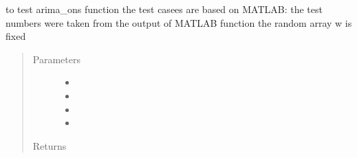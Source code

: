 \documentclass[letterpaper,10pt,english]{sphinxmanual}
\begin{document}
\begin{fulllineitems}
\label{\detokenize{LDS:LDS.OnlineLDS_library.test_arima_ons}}
\sphinxAtStartPar
to test arima\_ons function
the test casees are based on MATLAB:
the test numbers were taken from the output of MATLAB function
the random array w is fixed
\begin{quote}\begin{description}
\item[{Parameters}] \leavevmode\begin{itemize}
\item {} 
\sphinxAtStartPar
{} \textendash{} 

\item {} 
\sphinxAtStartPar
{} \textendash{} 

\item {} 
\sphinxAtStartPar
{} \textendash{} 

\item {} 
\sphinxAtStartPar
{} \textendash{} 

\end{itemize}

\item[{Returns}] \leavevmode
\sphinxAtStartPar


\end{description}\end{quote}

\end{fulllineitems}

\end{document}
